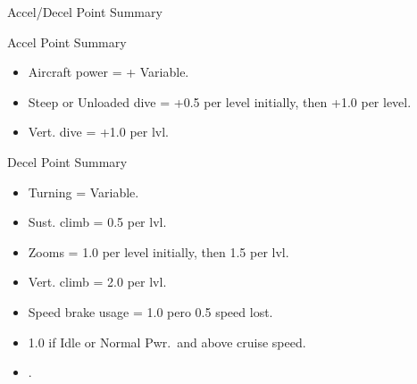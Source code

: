\begin{table}
\centering
\caption{Accel/Decel Point Summary}
\medskip
Accel Point Summary\par
\medskip
\begin{minipage}{\linewidth}
\begin{itemize}
    \item Aircraft power = + Variable.
    \item Steep or Unloaded dive = +0.5 per level initially, then +1.0 per level.
    \item Vert. dive = +1.0 per lvl.
\end{itemize}
\end{minipage}
\medskip

Decel Point Summary\par
\medskip
\begin{minipage}{\linewidth}
\begin{itemize}
    \item Turning = Variable.
    \item Sust. climb = 0.5 per lvl.
    \item Zooms = 1.0 per level initially, then 1.5 per lvl.
    \item Vert. climb = 2.0 per lvl.
    \item Speed brake usage = 1.0 pero 0.5 speed lost.
    \item 1.0 if Idle or Normal Pwr.\ and above cruise speed.
    \item {}
    .
\end{itemize}
\end{minipage}
\end{table}
